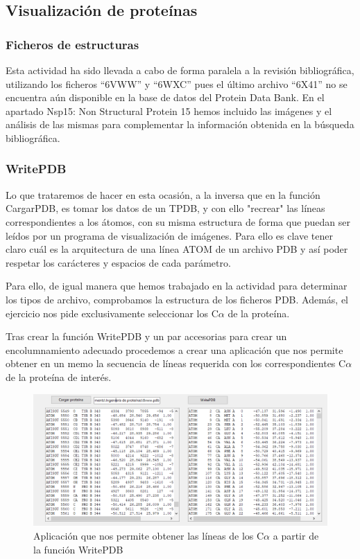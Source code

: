 \documentclass[12pt]{article}
\begin{document}
\subsection{Visualización de proteínas}
\subsubsection{Ficheros de estructuras}
Esta actividad ha sido llevada a cabo de forma paralela a la revisión bibliográfica, utilizando los ficheros ``6VWW'' y ``6WXC'' pues el último archivo ``6X41'' no se encuentra aún disponible en la base de datos del Protein Data Bank. En el apartado Nsp15: Non Structural Protein 15 hemos incluido las imágenes y el análisis de las mismas para complementar la información obtenida en la búsqueda bibliográfica.

\subsubsection{WritePDB}
Lo que trataremos de hacer en esta ocasión, a la inversa que en la función CargarPDB, es tomar los datos de un TPDB, y con ello "recrear" las líneas correspondientes a los átomos, con su misma estructura de forma que puedan ser leídos por un programa de visualización de imágenes. Para ello es clave tener claro cuál es la arquitectura de una línea ATOM de un archivo PDB y así poder respetar los carácteres y espacios de cada parámetro.
\newline

Para ello, de igual manera que hemos trabajado en la actividad para determinar los tipos de archivo, comprobamos la estructura de los ficheros PDB. Además, el ejercicio nos pide exclusivamente seleccionar los C$\alpha$ de la proteína.
\newline

Tras crear la función WritePDB y un par accesorias para crear un encolumnamiento adecuado procedemos a crear una aplicación que nos permite obtener en un memo la secuencia de líneas requerida con los correspondientes C$\alpha$ de la proteína de interés. 

\begin{figure}[H]
\centering
\includegraphics[scale=0.6]{Screenshot_28}
\caption{Aplicación que nos permite obtener las líneas de los C$\alpha$ a partir de la función WritePDB }
\end{figure}
\end{document}
